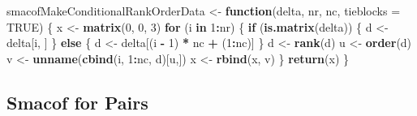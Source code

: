 \documentclass[
  12pt,
]{article}
\newenvironment{Shaded}{\begin{snugshade}}{\end{snugshade}}
\newcommand{\AttributeTok}[1]{\textcolor[rgb]{0.13,0.29,0.53}{#1}}
\newcommand{\ConstantTok}[1]{\textcolor[rgb]{0.56,0.35,0.01}{#1}}
\newcommand{\ControlFlowTok}[1]{\textcolor[rgb]{0.13,0.29,0.53}{\textbf{#1}}}
\newcommand{\DecValTok}[1]{\textcolor[rgb]{0.00,0.00,0.81}{#1}}
\newcommand{\FunctionTok}[1]{\textcolor[rgb]{0.13,0.29,0.53}{\textbf{#1}}}
\newcommand{\NormalTok}[1]{#1}
\newcommand{\OtherTok}[1]{\textcolor[rgb]{0.56,0.35,0.01}{#1}}
\newcommand{\SpecialCharTok}[1]{\textcolor[rgb]{0.81,0.36,0.00}{\textbf{#1}}}
\begin{document}
\begin{Shaded}
\begin{Highlighting}[]
\NormalTok{smacofMakeConditionalRankOrderData }\OtherTok{\textless{}{-}}
  \ControlFlowTok{function}\NormalTok{(delta, nr, nc, }\AttributeTok{tieblocks =} \ConstantTok{TRUE}\NormalTok{) \{}
\NormalTok{    x }\OtherTok{\textless{}{-}} \FunctionTok{matrix}\NormalTok{(}\DecValTok{0}\NormalTok{, }\DecValTok{0}\NormalTok{, }\DecValTok{3}\NormalTok{)}
    \ControlFlowTok{for}\NormalTok{ (i }\ControlFlowTok{in} \DecValTok{1}\SpecialCharTok{:}\NormalTok{nr) \{}
      \ControlFlowTok{if}\NormalTok{ (}\FunctionTok{is.matrix}\NormalTok{(delta)) \{}
\NormalTok{        d }\OtherTok{\textless{}{-}}\NormalTok{ delta[i, ]}
\NormalTok{      \} }\ControlFlowTok{else}\NormalTok{ \{}
\NormalTok{        d }\OtherTok{\textless{}{-}}\NormalTok{ delta[(i }\SpecialCharTok{{-}} \DecValTok{1}\NormalTok{) }\SpecialCharTok{*}\NormalTok{ nc }\SpecialCharTok{+}\NormalTok{ (}\DecValTok{1}\SpecialCharTok{:}\NormalTok{nc)]}
\NormalTok{      \}}
\NormalTok{      d }\OtherTok{\textless{}{-}} \FunctionTok{rank}\NormalTok{(d)}
\NormalTok{      u }\OtherTok{\textless{}{-}} \FunctionTok{order}\NormalTok{(d)}
\NormalTok{      v }\OtherTok{\textless{}{-}} \FunctionTok{unname}\NormalTok{(}\FunctionTok{cbind}\NormalTok{(i, }\DecValTok{1}\SpecialCharTok{:}\NormalTok{nc, d)[u,])}
\NormalTok{      x }\OtherTok{\textless{}{-}} \FunctionTok{rbind}\NormalTok{(x, v)}
\NormalTok{    \}}
    \FunctionTok{return}\NormalTok{(x)}
\NormalTok{  \}}
\end{Highlighting}
\end{Shaded}

\subsection{Smacof for Pairs}\label{smacof-for-pairs}
\end{document}
